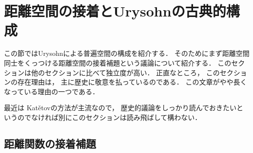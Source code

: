 \documentclass[leqno, 12pt]{jsarticle}
\begin{document}

\newpage
\section{距離空間の接着とUrysohnの古典的構成}\label{sec:sechaku}
この節ではUrysohnによる普遍空間の構成を紹介する．
そのためにまず距離空間同士をくっつける距離空間の接着補題という議論について紹介する．
このセクションは他のセクションに比べて独立度が高い．
正直なところ，
このセクションの存在理由は，
主に歴史に敬意を払っているのである．
この文章がやや長くなっている理由の一つである．



最近は
Kat\v{e}tovの方法が主流なので，%
歴史的議論をしっかり読んでおきたいというのでなければ別にこのセクションは読み飛ばして構わない．
\subsection{距離関数の接着補題}\label{subsec:amalgamation:lemma}
\end{document}
